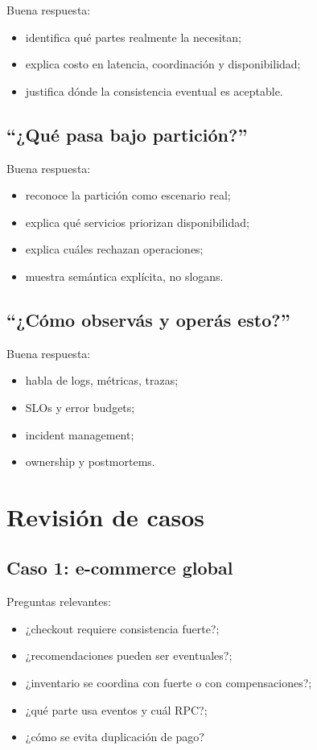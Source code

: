 \documentclass[variant=apuntes,cover=institutional,mode=screen]{ua-engineering-v6-article}
\begin{document}
Buena respuesta:
\begin{itemize}
\item identifica qué partes realmente la necesitan;
\item explica costo en latencia, coordinación y disponibilidad;
\item justifica dónde la consistencia eventual es aceptable.
\end{itemize}

\subsection{“¿Qué pasa bajo partición?”}

Buena respuesta:
\begin{itemize}
\item reconoce la partición como escenario real;
\item explica qué servicios priorizan disponibilidad;
\item explica cuáles rechazan operaciones;
\item muestra semántica explícita, no slogans.
\end{itemize}

\subsection{“¿Cómo observás y operás esto?”}

Buena respuesta:
\begin{itemize}
\item habla de logs, métricas, trazas;
\item SLOs y error budgets;
\item incident management;
\item ownership y postmortems.
\end{itemize}

\section{Revisión de casos}

\subsection{Caso 1: e-commerce global}

Preguntas relevantes:
\begin{itemize}
\item ¿checkout requiere consistencia fuerte?;
\item ¿recomendaciones pueden ser eventuales?;
\item ¿inventario se coordina con fuerte o con compensaciones?;
\item ¿qué parte usa eventos y cuál RPC?;
\item ¿cómo se evita duplicación de pago?
\end{itemize}
\end{document}

